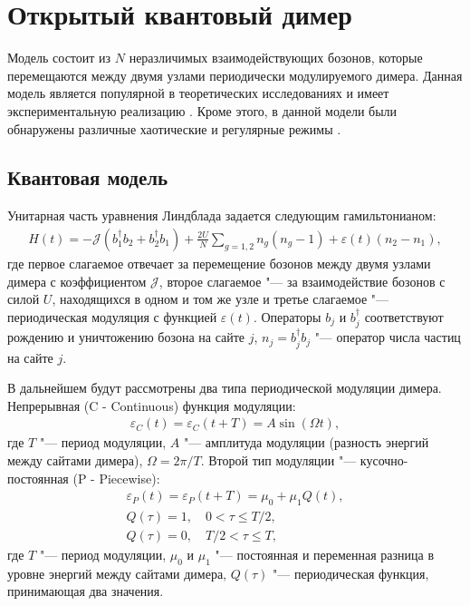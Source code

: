\section{Открытый квантовый димер}\label{sec:ch3/dimer}
Модель состоит из \(N\) неразличимых взаимодействующих бозонов, которые перемещаются между двумя узлами периодически модулируемого димера. 
Данная модель является популярной в теоретических исследованиях \cite{Vardi2001, Trimborn2008, Poletti2012} и имеет экспериментальную реализацию \cite{Gross2010, Tomkovic2017}. Кроме этого, в данной модели были обнаружены различные хаотические и регулярные режимы \cite{Hartmann2017, Ivanchenko2017, Carlo2017, Wang2018}. 

\subsection{Квантовая модель}\label{subsec:ch3/dimer/quantum}

Унитарная часть уравнения Линдблада  задается следующим гамильтонианом:
\begin{equation}
	\label{eq:dimer_H}
	\begin{gathered}
		H(t) = -\mathcal{J} \left(b^\dagger_1 b_2 + b^\dagger_2 b_1\right) + \frac{2 U}{N} \sum_{g=1,2} n_g \left(n_g - 1\right) + \varepsilon(t) \left(n_2 - n_1\right),
	\end{gathered}
\end{equation}
где первое слагаемое отвечает за перемещение бозонов между двумя узлами димера с коэффициентом \(\mathcal{J}\), второе слагаемое "--- за взаимодействие бозонов с силой \(U\), находящихся в  одном и том же узле и третье слагаемое "--- периодическая модуляция с функцией \(\varepsilon(t)\). 
Операторы \(b_j\) и \(b^\dagger_j\) соответствуют рождению и уничтожению бозона на сайте \(j\), \(n_j = b^\dagger_j b_j\) "--- оператор числа частиц на сайте \(j\).

В дальнейшем будут рассмотрены два типа периодической модуляции димера.
Непрерывная (C - Continuous) функция модуляции:
\begin{equation}
	\label{eq:dimer_mod_c}
	\begin{gathered}
		\varepsilon_{C}(t) = \varepsilon_{C}(t + T) = A \sin(\Omega t),
	\end{gathered}
\end{equation}
где \(T\) "--- период модуляции, \(A\) "--- амплитуда модуляции (разность энергий между сайтами димера), \(\Omega = 2 \pi / T\).
Второй тип модуляции "--- кусочно-постоянная (P - Piecewise):
\begin{equation}
	\label{eq:dimer_mod_p}
	\begin{gathered}
		\varepsilon_{P}(t) = \varepsilon_{P}(t + T) = \mu_0 + \mu_1 Q(t), \\
		Q(\tau) = 1, \quad 0 < \tau \le T/2, \\
		Q(\tau) = 0, \quad T/2 < \tau \le T,
	\end{gathered}
\end{equation}
где \(T\) "--- период модуляции, \(\mu_0\) и \(\mu_1\) "--- постоянная и переменная разница в уровне энергий между сайтами димера, \(Q(\tau)\) "--- периодическая функция, принимающая два значения.

